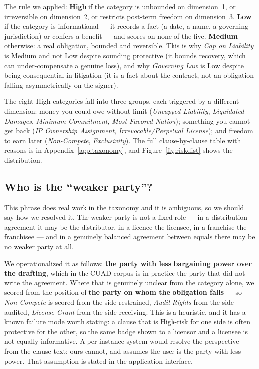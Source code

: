 The rule we applied: \textbf{High} if the category is unbounded on dimension~1, or irreversible on dimension~2, or restricts post-term freedom on dimension~3. \textbf{Low} if the category is informational --- it records a fact (a date, a name, a governing jurisdiction) or confers a benefit --- and scores on none of the five. \textbf{Medium} otherwise: a real obligation, bounded and reversible. This is why \emph{Cap on Liability} is Medium and not Low despite sounding protective (it bounds recovery, which can under-compensate a genuine loss), and why \emph{Governing Law} is Low despite being consequential in litigation (it is a fact about the contract, not an obligation falling asymmetrically on the signer).

The eight High categories fall into three groups, each triggered by a different dimension: money you could owe without limit (\emph{Uncapped Liability}, \emph{Liquidated Damages}, \emph{Minimum Commitment}, \emph{Most Favored Nation}); something you cannot get back (\emph{IP Ownership Assignment}, \emph{Irrevocable/Perpetual License}); and freedom to earn later (\emph{Non-Compete}, \emph{Exclusivity}). The full clause-by-clause table with reasons is in Appendix~\ref{app:taxonomy}, and Figure~\ref{fig:riskdist} shows the distribution.

\subsection{Who is the ``weaker party''?}
\label{sec:weaker}
This phrase does real work in the taxonomy and it is ambiguous, so we should say how we resolved it. The weaker party is not a fixed role --- in a distribution agreement it may be the distributor, in a licence the licensee, in a franchise the franchisee --- and in a genuinely balanced agreement between equals there may be no weaker party at all.

We operationalized it as follows: \textbf{the party with less bargaining power over the drafting}, which in the CUAD corpus is in practice the party that did not write the agreement. Where that is genuinely unclear from the category alone, we scored from the position of \textbf{the party on whom the obligation falls} --- so \emph{Non-Compete} is scored from the side restrained, \emph{Audit Rights} from the side audited, \emph{License Grant} from the side receiving. This is a heuristic, and it has a known failure mode worth stating: a clause that is High-risk for one side is often protective for the other, so the same badge shown to a licensor and a licensee is not equally informative. A per-instance system would resolve the perspective from the clause text; ours cannot, and assumes the user is the party with less power. That assumption is stated in the application interface.

